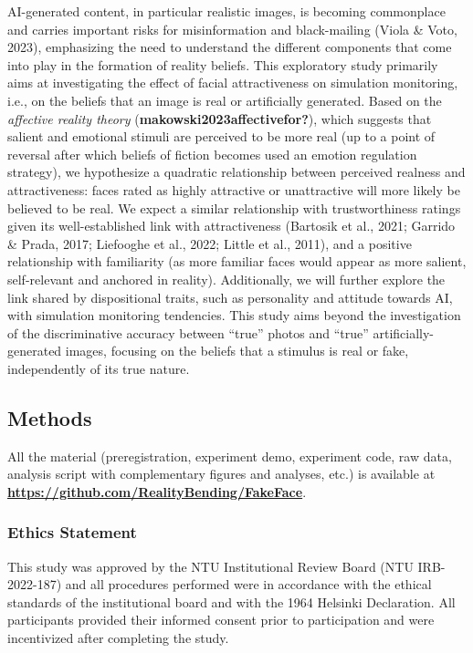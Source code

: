 \documentclass[
  man,floatsintext]{apa6}
\begin{document}
AI-generated content, in particular realistic images, is becoming commonplace and carries important risks for misinformation and black-mailing (Viola \& Voto, 2023), emphasizing the need to understand the different components that come into play in the formation of reality beliefs.
This exploratory study primarily aims at investigating the effect of facial attractiveness on simulation monitoring, i.e., on the beliefs that an image is real or artificially generated. Based on the \emph{affective reality theory}
(\textbf{makowski2023affectivefor?}),
which suggests that salient and emotional stimuli are perceived to be more real (up to a point of reversal after which beliefs of fiction becomes used an emotion regulation strategy), we hypothesize a quadratic relationship between perceived realness and attractiveness: faces rated as highly attractive or unattractive will more likely be believed to be real. We expect a similar relationship with trustworthiness ratings given its well-established link with attractiveness (Bartosik et al., 2021; Garrido \& Prada, 2017; Liefooghe et al., 2022; Little et al., 2011), and a positive relationship with familiarity (as more familiar faces would appear as more salient, self-relevant and anchored in reality). Additionally, we will further explore the link shared by dispositional traits, such as personality and attitude towards AI, with simulation monitoring tendencies. This study aims beyond the investigation of the discriminative accuracy between ``true'' photos and ``true'' artificially-generated images, focusing on the beliefs that a stimulus is real or fake, independently of its true nature.

\hypertarget{methods}{%
\subsection{Methods}\label{methods}}

All the material (preregistration, experiment demo, experiment code, raw data, analysis script with complementary figures and analyses, etc.) is available at \href{https://github.com/RealityBending/FakeFace}{\textbf{https://github.com/RealityBending/FakeFace}}.

\hypertarget{ethics-statement}{%
\subsubsection{Ethics Statement}\label{ethics-statement}}

This study was approved by the NTU Institutional Review Board (NTU IRB-2022-187) and all procedures performed were in accordance with the ethical standards of the institutional board and with the 1964 Helsinki Declaration. All participants provided their informed consent prior to participation and were incentivized after completing the study.
\end{document}
